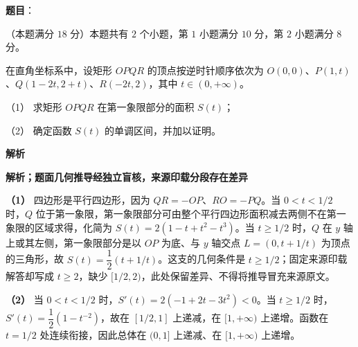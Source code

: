 \begin{answer}

\textbf{题目}：

（本题满分 $18$ 分）本题共有 $2$ 个小题，第 $1$ 小题满分 $10$ 分，第 $2$ 小题满分 $8$ 分。

在直角坐标系中，设矩形 $OPQR$ 的顶点按逆时针顺序依次为 $O(0,0)$、$P(1,t)$、$Q(1-2t,2+t)$、$R(-2t,2)$，其中 $t\in(0,+\infty)$。

（1） 求矩形 $OPQR$ 在第一象限部分的面积 $S(t)$；

（2） 确定函数 $S(t)$ 的单调区间，并加以证明。

\textbf{解析}

\textbf{解析；题面几何推导经独立盲核，来源印载分段存在差异}

\textbf{（1）} 四边形是平行四边形，因为 $QR=-OP$、$RO=-PQ$。当 $0<t<1/2$ 时，$Q$ 位于第一象限，第一象限部分可由整个平行四边形面积减去两侧不在第一象限的区域求得，化简为 $S(t)=2(1-t+t^2-t^3)$。当 $t\ge1/2$ 时，$Q$ 在 $y$ 轴上或其左侧，第一象限部分是以 $OP$ 为底、与 $y$ 轴交点 $L=(0,t+1/t)$ 为顶点的三角形，故 $S(t)=\dfrac12(t+1/t)$。这支的几何条件是 $t\ge1/2$；固定来源印载解答却写成 $t\ge2$，缺少 $[1/2,2)$，此处保留差异、不得将推导冒充来源原文。
\nopagebreak[4]
\begin{center}\end{center}
\nopagebreak[4]
\textbf{（2）} 当 $0<t<1/2$ 时，$S'(t)=2(-1+2t-3t^2)<0$。当 $t\ge1/2$ 时，$S'(t)=\dfrac12(1-t^{-2})$，故在 $[1/2,1]$ 上递减，在 $[1,+\infty)$ 上递增。函数在 $t=1/2$ 处连续衔接，因此总体在 $(0,1]$ 上递减、在 $[1,+\infty)$ 上递增。


\gkanswer{答案（2）：$S(t)$ 在 $(0,1]$ 上递减、在 $[1,+\infty)$ 上递增，最小值为 $S(1)=1$。}

\end{answer}
